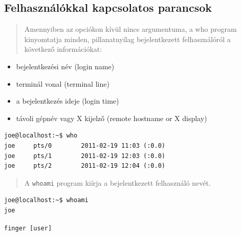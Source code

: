 \subsection{Felhasználókkal kapcsolatos parancsok}
\noindent{}
%
\begin{quotation}
Amennyiben az opciókon kívül nincs argumentuma, a who program kinyomtatja minden, pillanatnyilag bejelentkezett felhasználóról a következő információkat:
\end{quotation}

\begin{itemize}
\item bejelentkezési név (login name) 
\item terminál vonal (terminal line) 
\item a bejelentkezés ideje (login time) 
\item távoli gépnév vagy X kijelző (remote hostname or X display)
\end{itemize}

\begin{lstlisting}
joe@localhost:~$ who
joe     pts/0        2011-02-19 11:03 (:0.0)
joe     pts/1        2011-02-19 12:03 (:0.0)
joe     pts/2        2011-02-19 12:04 (:0.0)
\end{lstlisting}



\noindent{}
%
\begin{quotation}
A \texttt{whoami} program kiírja a bejelentkezett felhasználó nevét.
\end{quotation}
\begin{lstlisting}
joe@localhost:~$ whoami
joe
\end{lstlisting}



\noindent{}

\hfill\texttt{finger [user]}
\medskip

